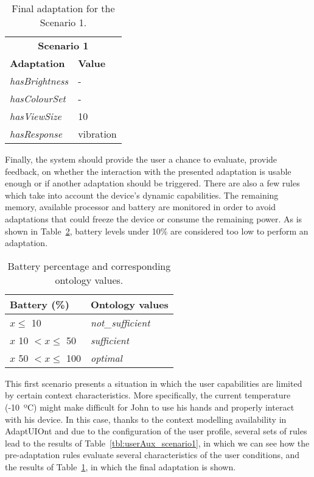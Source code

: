 \begin{table}
 \caption{Final adaptation for the Scenario 1.}
 \label{tbl:final_adaptation_scenario1}
 \footnotesize
 \centering
\begin{tabular}{l l}
  \hline 
  \multicolumn{2}{c}{\textbf{Scenario 1}}\\	
  \textbf{Adaptation} 	& \textbf{Value}\\ 
  \hline
  \textit{hasBrightness}& -		\\
  \textit{hasColourSet}	& -		\\
  \textit{hasViewSize}	& 10		\\
  \textit{hasResponse}	& vibration	\\
  \hline
\end{tabular}
\end{table}

Finally, the system should provide the user a chance to evaluate, provide 
feedback, on whether the interaction with the presented adaptation is usable 
enough or if another adaptation should be triggered. There are also a few rules 
which take into account the device’s dynamic capabilities. The remaining 
memory, available processor and battery are monitored in order to avoid 
adaptations that could freeze the device or consume the remaining power. As is 
shown in Table~\ref{tbl:battery}, battery levels under 10\% are considered too 
low to perform an adaptation.

\begin{table}
 \caption{Battery percentage and corresponding ontology values.}
 \label{tbl:battery}
 \footnotesize
 \centering
\begin{tabular}{l l}
  \hline 
  \textbf{Battery (\%)} & \textbf{Ontology values}	\\
  \hline
   $x \leq$ 10 		& \textit{not\_sufficient}	\\
   $x$ 10 $< x \leq$ 50 	& \textit{sufficient} 		\\
   $x$ 50 $< x \leq$ 100 	& \textit{optimal}		\\
  \hline
\end{tabular}
\end{table}

\label{sec:scenario1_discussion}

This first scenario presents a situation in which the user capabilities are
limited by certain context characteristics. More specifically, the current
temperature (-10~ºC) might make difficult for John to use his hands and properly
interact with his device. In this case, thanks to the context modelling 
availability in AdaptUIOnt and due to the configuration of the user profile, 
several sets of rules lead to the results of Table~\ref{tbl:userAux_scenario1},
in which we can see how the pre-adaptation rules evaluate several 
characteristics of the user conditions, and the results of 
Table~\ref{tbl:final_adaptation_scenario1}, in which the final adaptation is 
shown.

